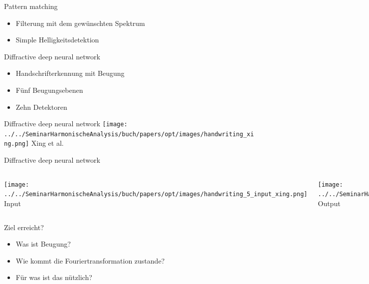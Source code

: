 \documentclass{beamer}
\begin{document}
\begin{frame}{Pattern matching}
    \begin{itemize}
        \item Filterung mit dem gewünschten Spektrum
        \item Simple Helligkeitsdetektion
    \end{itemize}
\end{frame}

\begin{frame}{Diffractive deep neural network}
    \begin{itemize}
        \item Handschrifterkennung mit Beugung
        \item Fünf Beugungsebenen
        \item Zehn Detektoren
    \end{itemize}
\end{frame}

\begin{frame}{Diffractive deep neural network}
    \centering
    \texttt{[image: ../../SeminarHarmonischeAnalysis/buch/papers/opt/images/handwriting\_xing.png]}
    Xing et al. \cite{opt:Lin.2018}
\end{frame}

\begin{frame}{Diffractive deep neural network}
	\begin{columns}
        \texttt{[image: ../../SeminarHarmonischeAnalysis/buch/papers/opt/images/handwriting\_5\_input\_xing.png]}
        Input
		
        \texttt{[image: ../../SeminarHarmonischeAnalysis/buch/papers/opt/images/handwriting\_5\_output\_xing.png]}
        Output
	\end{columns}
\end{frame}

\begin{frame}{Ziel erreicht?}
    \begin{itemize}
        \item Was ist Beugung?
        \item Wie kommt die Fouriertransformation zustande?
        \item Für was ist das nützlich?
    \end{itemize}
\end{frame}

\end{document}
